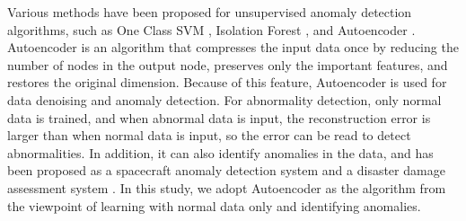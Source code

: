 \documentclass[paper]{ieice}
\begin{document}
%
Various methods have been proposed for unsupervised anomaly detection algorithms, such as One Class SVM \cite{chen2001one}, Isolation Forest \cite{Isolationforest}, and Autoencoder \cite{bank2021autoencoders}.
%
Autoencoder is an algorithm that compresses the input data once by reducing the number of nodes in the output node, preserves only the important features, and restores the original dimension.
%
Because of this feature, Autoencoder is used for data denoising and anomaly detection.
%
For abnormality detection, only normal data is trained, and when abnormal data is input, the reconstruction error is larger than when normal data is input, so the error can be read to detect abnormalities.
%
In addition, it can also identify anomalies in the data, and has been proposed as a spacecraft anomaly detection system \cite{sakurada} and a disaster damage assessment system \cite{kinami}.
%
In this study, we adopt Autoencoder as the algorithm from the viewpoint of learning with normal data only and identifying anomalies.
%


\begin{thebibliography}{99}%
\bibitem{}
\end{thebibliography}

\end{document}
